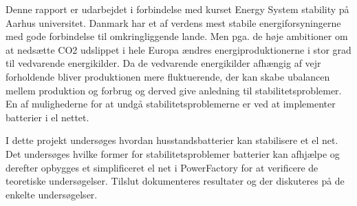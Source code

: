 
\label{Indledning}

Denne rapport er udarbejdet i forbindelse med kurset Energy System stability på Aarhus universitet. 
Danmark har et af verdens mest stabile energiforsyningerne med gode forbindelse til omkringliggende lande. Men pga. de høje ambitioner om at nedsætte CO2 udslippet i hele Europa ændres energiproduktionerne i stor grad til vedvarende energikilder. Da de vedvarende energikilder afhængig af vejr forholdende bliver produktionen mere fluktuerende, der kan skabe ubalancen mellem produktion og forbrug og derved give anledning til stabilitetsproblemer. En af mulighederne for at undgå stabilitetsproblemerne er ved at implementer batterier i el nettet.

I dette projekt undersøges hvordan husstandsbatterier kan stabilisere et el net. Det undersøges hvilke former for stabilitetsproblemer batterier kan afhjælpe og derefter opbygges et simplificeret el net i PowerFactory for at verificere de teoretiske undersøgelser. Tilslut dokumenteres resultater og der diskuteres på de enkelte undersøgelser.

